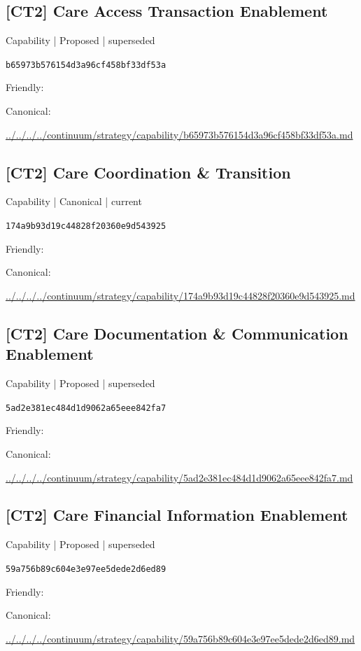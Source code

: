 \documentclass[10pt,a4paper]{article}
\begin{document}
\subsection*{[CT2] Care Access Transaction Enablement}
{\small Capability | Proposed | superseded}\par
\texttt{b65973b576154d3a96cf458bf33df53a}\par
Friendly: \par
Canonical: \par
{\footnotesize\url{../../../../continuum/strategy/capability/b65973b576154d3a96cf458bf33df53a.md}}\par
\subsection*{[CT2] Care Coordination \& Transition}
{\small Capability | Canonical | current}\par
\texttt{174a9b93d19c44828f20360e9d543925}\par
Friendly: \par
Canonical: \par
{\footnotesize\url{../../../../continuum/strategy/capability/174a9b93d19c44828f20360e9d543925.md}}\par
\subsection*{[CT2] Care Documentation \& Communication Enablement}
{\small Capability | Proposed | superseded}\par
\texttt{5ad2e381ec484d1d9062a65eee842fa7}\par
Friendly: \par
Canonical: \par
{\footnotesize\url{../../../../continuum/strategy/capability/5ad2e381ec484d1d9062a65eee842fa7.md}}\par
\subsection*{[CT2] Care Financial Information Enablement}
{\small Capability | Proposed | superseded}\par
\texttt{59a756b89c604e3e97ee5dede2d6ed89}\par
Friendly: \par
Canonical: \par
{\footnotesize\url{../../../../continuum/strategy/capability/59a756b89c604e3e97ee5dede2d6ed89.md}}\par
\end{document}
